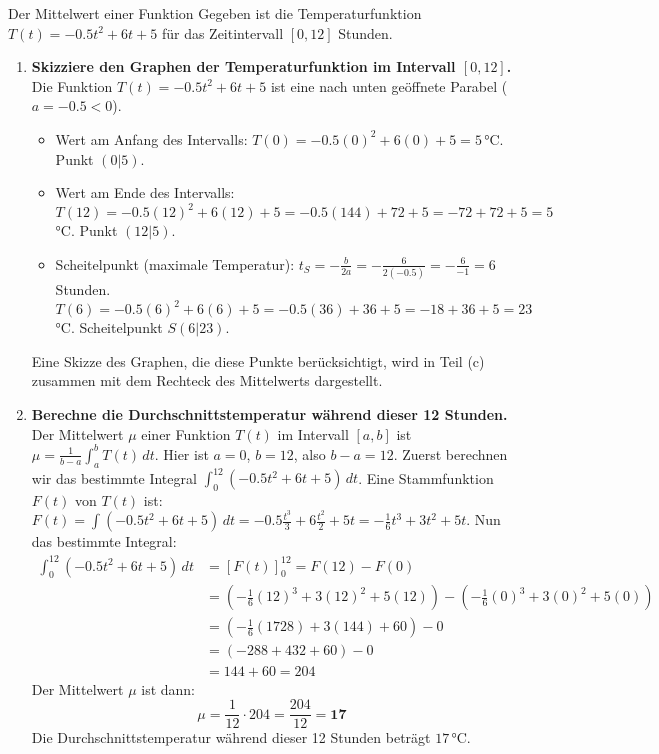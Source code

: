 \begin{loesungsumgebung}{Der Mittelwert einer Funktion}
Gegeben ist die Temperaturfunktion $T(t) = -0.5t^2 + 6t + 5$ für das Zeitintervall $[0,12]$ Stunden.

\begin{enumerate}[label=(\alph*)]
    \item \textbf{Skizziere den Graphen der Temperaturfunktion im Intervall $[0,12]$.}
    Die Funktion $T(t) = -0.5t^2 + 6t + 5$ ist eine nach unten geöffnete Parabel ($a=-0.5 < 0$).
    \begin{itemize}
        \item Wert am Anfang des Intervalls: $T(0) = -0.5(0)^2 + 6(0) + 5 = 5\,$°C. Punkt $(0|5)$.
        \item Wert am Ende des Intervalls: $T(12) = -0.5(12)^2 + 6(12) + 5 = -0.5(144) + 72 + 5 = -72 + 72 + 5 = 5\,$°C. Punkt $(12|5)$.
        \item Scheitelpunkt (maximale Temperatur):
        $t_S = -\frac{b}{2a} = -\frac{6}{2(-0.5)} = -\frac{6}{-1} = 6\,$Stunden.
        $T(6) = -0.5(6)^2 + 6(6) + 5 = -0.5(36) + 36 + 5 = -18 + 36 + 5 = 23\,$°C. Scheitelpunkt $S(6|23)$.
    \end{itemize}
    Eine Skizze des Graphen, die diese Punkte berücksichtigt, wird in Teil (c) zusammen mit dem Rechteck des Mittelwerts dargestellt.

    \item \textbf{Berechne die Durchschnittstemperatur während dieser 12 Stunden.}
    Der Mittelwert $\mu$ einer Funktion $T(t)$ im Intervall $[a,b]$ ist $\mu = \frac{1}{b-a} \int_a^b T(t) \,dt$.
    Hier ist $a=0$, $b=12$, also $b-a = 12$.
    Zuerst berechnen wir das bestimmte Integral $\int_{0}^{12} (-0.5t^2 + 6t + 5) \,dt$.
    Eine Stammfunktion $F(t)$ von $T(t)$ ist:
    $F(t) = \int (-0.5t^2 + 6t + 5) \,dt = -0.5 \frac{t^3}{3} + 6 \frac{t^2}{2} + 5t = -\frac{1}{6}t^3 + 3t^2 + 5t$.
    Nun das bestimmte Integral:
    \begin{align*}
    \int_{0}^{12} (-0.5t^2 + 6t + 5) \,dt &= [F(t)]_{0}^{12} = F(12) - F(0) \\
    &= \left(-\frac{1}{6}(12)^3 + 3(12)^2 + 5(12)\right) - \left(-\frac{1}{6}(0)^3 + 3(0)^2 + 5(0)\right) \\
    &= \left(-\frac{1}{6}(1728) + 3(144) + 60\right) - 0 \\
    &= (-288 + 432 + 60) - 0 \\
    &= 144 + 60 = 204
    \end{align*}
    Der Mittelwert $\mu$ ist dann:
    $$ \mu = \frac{1}{12} \cdot 204 = \frac{204}{12} = \mathbf{17} $$
    Die Durchschnittstemperatur während dieser 12 Stunden beträgt $17\,$°C.


\end{enumerate}
\end{loesungsumgebung}
